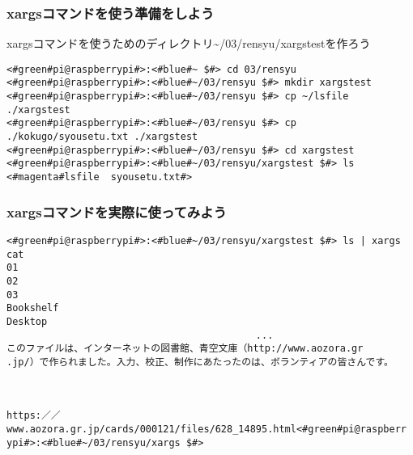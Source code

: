 \begin{frame}[fragile]
    \frametitle{xargsコマンドを使う準備をしよう}
    xargsコマンドを使うためのディレクトリ\textasciitilde/03/rensyu/xargstestを作ろう
    \begin{lstlisting}
<#green#pi@raspberrypi#>:<#blue#~ $#> cd 03/rensyu
<#green#pi@raspberrypi#>:<#blue#~/03/rensyu $#> mkdir xargstest
<#green#pi@raspberrypi#>:<#blue#~/03/rensyu $#> cp ~/lsfile ./xargstest
<#green#pi@raspberrypi#>:<#blue#~/03/rensyu $#> cp ./kokugo/syousetu.txt ./xargstest
<#green#pi@raspberrypi#>:<#blue#~/03/rensyu $#> cd xargstest
<#green#pi@raspberrypi#>:<#blue#~/03/rensyu/xargstest $#> ls
<#magenta#lsfile  syousetu.txt#>
    \end{lstlisting}
\end{frame}

\begin{frame}[fragile]
    \frametitle{xargsコマンドを実際に使ってみよう}
    \begin{lstlisting}[title=xargsコマンドを使ってcatコマンドを使う]
<#green#pi@raspberrypi#>:<#blue#~/03/rensyu/xargstest $#> ls | xargs cat
01
02
03
Bookshelf
Desktop
                                           ...
このファイルは、インターネットの図書館、青空文庫（http://www.aozora.gr
.jp/）で作られました。入力、校正、制作にあたったのは、ボランティアの皆さんです。


                
https:／／www.aozora.gr.jp/cards/000121/files/628_14895.html<#green#pi@raspberr
ypi#>:<#blue#~/03/rensyu/xargs $#>
\end{lstlisting}
\end{frame}

